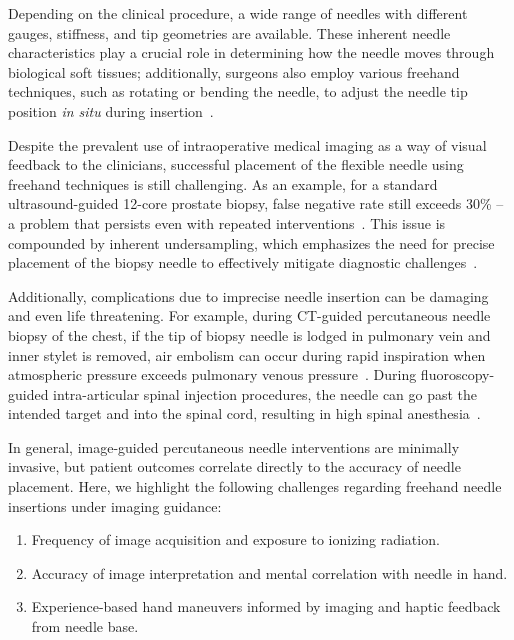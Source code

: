 Depending on the clinical procedure, a wide range of needles with different gauges, stiffness, and tip geometries are available. These inherent needle characteristics play a crucial role in determining how the needle moves through biological soft tissues; additionally, surgeons also employ various freehand techniques, such as rotating or bending the needle, to adjust the needle tip position \textit{in situ} during insertion~\parencite{calthorpeHistorySpinalNeedles2004,tsenNeedlesUsedSpinal2006,fritzAugmentedRealityVisualization2012}.

Despite the prevalent use of intraoperative medical imaging as a way of visual feedback to the clinicians, successful placement of the flexible needle using freehand techniques is still challenging. As an example, for a standard ultrasound-guided 12-core prostate biopsy, false negative rate still exceeds 30\% -- a problem that persists even with repeated interventions~\parencite{serefogluHowReliable12Core2013}. This issue is compounded by inherent undersampling, which emphasizes the need for precise placement of the biopsy needle to effectively mitigate diagnostic challenges~\parencite{prestiProstateBiopsyCurrent2007}.

Additionally, complications due to imprecise needle insertion can be damaging and even life threatening. For example, during CT-guided percutaneous needle biopsy of the chest, if the tip of biopsy needle is lodged in pulmonary vein and inner stylet is removed, air embolism can occur during rapid inspiration when atmospheric pressure exceeds pulmonary venous pressure~\parencite{wuComplicationsCTGuidedPercutaneous2011}. During fluoroscopy-guided intra-articular spinal injection procedures, the needle can go past the intended target and into the spinal cord, resulting in high spinal anesthesia~\parencite{bogdukComplicationsSpinalDiagnostic2008}.

In general, image-guided percutaneous needle interventions are minimally invasive, but patient outcomes correlate directly to the accuracy of needle placement. Here, we highlight the following challenges regarding freehand needle insertions under imaging guidance:
\begin{enumerate}
\item Frequency of image acquisition and exposure to ionizing radiation.
\item Accuracy of image interpretation and mental correlation with needle in hand.
\item Experience-based hand maneuvers informed by imaging and haptic feedback from needle base.
\end{enumerate}

